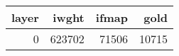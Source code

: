\begin{tabular}{rrrr}
\toprule
 layer &  iwght &  ifmap &  gold \\
\midrule
     0 & 623702 &  71506 & 10715 \\
\bottomrule
\end{tabular}
